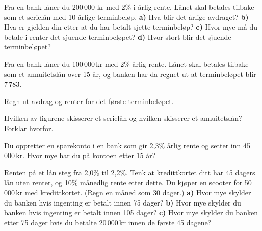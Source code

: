 \nes

Fra en bank låner du 200\,000 kr med 2\% i årlig rente. Lånet skal betales tilbake som et serielån med 10 årlige terminbeløp. \os
\textbf{a)} Hva blir det årlige avdraget?\os
\textbf{b)} Hva er gjelden din etter at du har betalt sjette terminbeløp?\os
\textbf{c)} Hvor mye må du betale i renter det sjuende terminbeløpet?\os
\textbf{d)} Hvor stort blir det sjuende terminbeløpet?\os 

Fra en bank låner du 100\,000\,kr med 2\% årlig rente. Lånet skal betales tilbake som et annuitetslån over 15 år, og banken har da regnet ut at terminbeløpet blir 7\,783.\os

Regn ut avdrag og renter for det første terminbeløpet.

Hvilken av figurene skisserer et serielån og hvilken skisserer et annuitetslån? Forklar hvorfor.
\begin{figure}	\centering
	\;
\end{figure}

Du oppretter en sparekonto i en bank som gir 2,3\% årlig rente og setter inn 45\,000\,kr. Hvor mye har du på kontoen etter 15 år?

Renten på et lån steg fra 2,0\% til 2,2\%.
\newpage
{}
Tenk at kredittkortet ditt har 45 dagers lån uten renter, og 10\% månedlig rente etter dette. Du kjøper en scooter for 50\,000\,kr med kredittkortet. (Regn en måned som 30 dager.)\os
\textbf{a)} Hvor mye skylder du banken hvis ingenting er betalt innen 75 dager?\os
\textbf{b)} Hvor mye skylder du banken hvis ingenting er betalt innen 105 dager?\os 
\textbf{c)} Hvor mye skylder du banken etter 75 dager hvis du betalte 20\,000\,kr innen de første 45 dagene?



